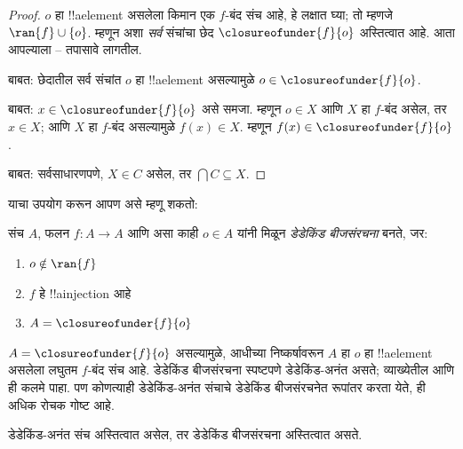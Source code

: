 \documentclass[../../../include/open-logic-section]{subfiles}
\begin{document}
\begin{proof}
$o$ हा !!a{element} असलेला किमान एक $f$-बंद संच आहे, हे लक्षात घ्या;
तो म्हणजे $\ran{f}\cup \{o\}$. म्हणून अशा \emph{सर्व} संचांचा छेद
$\closureofunder{f}{o}$ अस्तित्वात आहे. आता आपल्याला
-- तपासावे लागतील.

 बाबत: छेदातील सर्व संचांत $o$ हा !!a{element}
असल्यामुळे $o \in \closureofunder{f}{o}$.

 बाबत: $x \in \closureofunder{f}{o}$ असे समजा.
म्हणून $o \in X$ आणि $X$ हा $f$-बंद असेल, तर $x \in X$; आणि $X$ हा
$f$-बंद असल्यामुळे $f(x) \in X$. म्हणून
$f(x) \in \closureofunder{f}{o}$.

 बाबत: सर्वसाधारणपणे, $X \in C$ असेल, तर
$\bigcap C \subseteq X$.
\end{proof}

याचा उपयोग करून आपण असे म्हणू शकतो:

\begin{defn}
संच $A$, फलन $f \colon A \to A$ आणि असा काही $o \in A$ यांनी मिळून
\emph{डेडेकिंड बीजसंरचना} बनते, जर:
	\begin{enumerate}
		\item {} $o \notin \ran{f}$
		\item {} $f$ हे !!a{injection} आहे
		\item {} $A = \closureofunder{f}{o}$
	\end{enumerate}
\end{defn}

$A = \closureofunder{f}{o}$ असल्यामुळे, आधीच्या निष्कर्षावरून $A$ हा
$o$ हा !!a{element} असलेला लघुतम $f$-बंद संच आहे. डेडेकिंड बीजसंरचना
स्पष्टपणे डेडेकिंड-अनंत असते; व्याख्येतील  आणि
 ही कलमे पाहा. पण कोणत्याही डेडेकिंड-अनंत संचाचे
डेडेकिंड बीजसंरचनेत रूपांतर करता येते, ही अधिक रोचक गोष्ट आहे.

\begin{thm}
डेडेकिंड-अनंत संच अस्तित्वात असेल, तर डेडेकिंड बीजसंरचना अस्तित्वात असते.
\end{thm}
\end{document}
